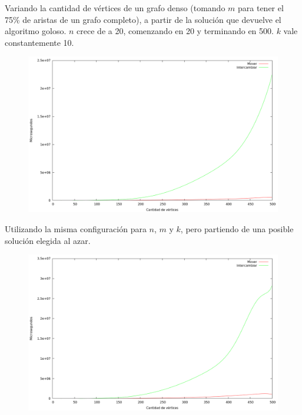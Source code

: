 \vspace*{0.75cm}

Variando la cantidad de vértices de un grafo denso (tomando $m$ para tener el
75\% de aristas de un grafo completo), a partir de la solución que devuelve el
algoritmo goloso. $n$ crece de a 20, comenzando en 20 y terminando en 500.  $k$
vale constantemente 10.

\vspace*{0.5cm}

\begin{figure}[H]
  \begin{center}
    \includegraphics[scale=0.35]{imagenes/local-goloso-n-tiempo.png}
  \end{center}
\end{figure}

\newpage

Utilizando la misma configuración para $n$, $m$ y $k$, pero partiendo de una
posible solución elegida al azar.

\vspace*{0.35cm}

\begin{figure}[H]
  \begin{center}
    \includegraphics[scale=0.35]{imagenes/local-random-n-tiempo.png}
  \end{center}
\end{figure}

